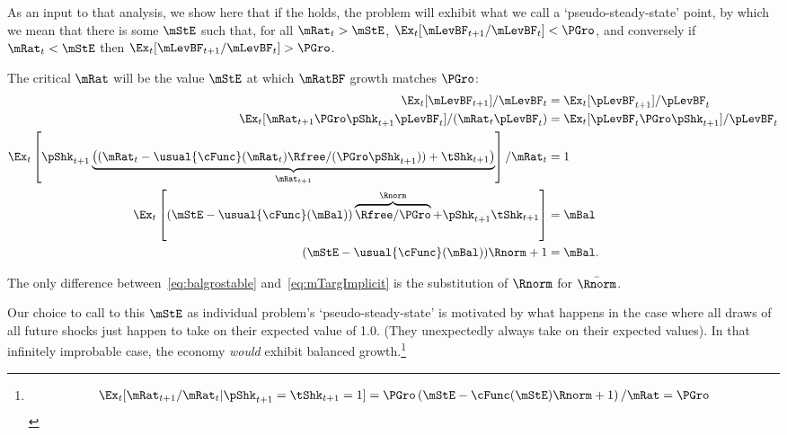 \documentclass[BufferStockTheory]{subfiles}
\begin{document}
As an input to that analysis, we show here that if the {\GIC} holds, the problem will exhibit what we call a `pseudo-steady-state' point, by which we mean that there is some ${\mStE}$ such that, for all $\mRat_{t}>{\mStE}$, $\Ex_{t}[\mLevBF_{t+1}/\mLevBF_{t}] < \PGro$, and conversely if $\mRat_{t}<{\mStE}$ then $\Ex_{t}[\mLevBF_{t+1}/\mLevBF_{t}] > \PGro$.  %

 \hypertarget{balgrostable}{}
 \hypertarget{balgrostableSolve}{}

 The critical $\mRat$ will be the value $\mStE$ at which $\mRatBF$ growth matches $\PGro$:
  \begin{align}
  \Ex_{t}[\mLevBF_{t+1}]/\mLevBF_{t} & =\Ex_{t}[\pLevBF_{t+1}]/\pLevBF_{t} \notag
    \\  \Ex_{t}[\mRat_{t+1}\PGro\pShk_{t+1}\pLevBF_{t}]/(\mRat_{t}\pLevBF_{t}) & =\Ex_{t}[\pLevBF_{t}\PGro\pShk_{t+1}]/\pLevBF_{t} \notag
    \\ \Ex_{t}\left[\pShk_{t+1}\underbrace{\left((\mRat_{t}-\usual{\cFunc}(\mRat_{t})\Rfree/(\PGro\pShk_{t+1}))+\tShk_{t+1}\right)}_{\mRat_{t+1}}\right]/\mRat_{t} & = 1 \notag
    \\
    \Ex_{t}\left[(\mStE-\usual{\cFunc}(\mBal))\overbrace{\Rfree/\PGro}^{\Rnorm}+\pShk_{t+1}\tShk_{t+1}\right] & = \mBal \notag
\\  (\mStE-\usual{\cFunc}(\mBal))\Rnorm+ 1 & = \mBal \label{eq:balgrostable}.
\end{align}

The only difference between~\eqref{eq:balgrostable} and~\eqref{eq:mTargImplicit} is the substitution of $\Rnorm$ for $\bar{\Rnorm}$.

Our choice to call to this $\mStE$ as individual problem's `pseudo-steady-state' is motivated by what happens in the case where all draws of all future shocks just happen to take on their expected value of 1.0.  (They unexpectedly always take on their expected values).  In that infinitely improbable case, the economy \textit{would} exhibit balanced growth.\footnote{    \begin{align*}      \Ex_{t}[\mRat_{t+1}/\mRat_{t}|\pShk_{t+1}=\tShk_{t+1}=1] = \PGro \left(\mStE-\cFunc(\mStE)\Rnorm + 1 \right)/\mRat = \PGro    \end{align*}}
\end{document}
